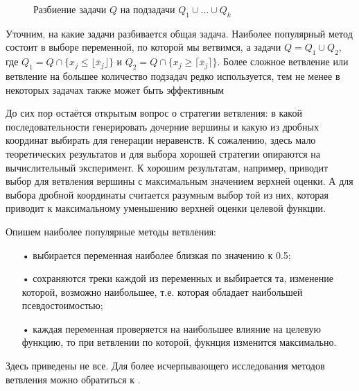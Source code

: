\documentclass[a4paper,14pt,russian]{extreport}
\begin{document}
\par
\begin{figure}[h]
\caption{Разбиение задачи $Q$ на подзадачи $Q_1 \cup \dots \cup Q_k$}
\label{ris:branching}
\end{figure}
\par
Уточним, на какие задачи разбивается общая задача. Наиболее популярный метод состоит в выборе переменной, по которой мы ветвимся, а задачи $Q = Q_1 \cup Q_2$, где $Q_1 = Q \cap \{x_j \le \lfloor \bar x_j \rfloor \}$ и $Q_2 = Q \cap \{x_j \ge \lceil \bar x_j \rceil \}$. Более сложное ветвление или ветвление на большее количество подзадач редко используется, тем не менее в некоторых задачах также может быть эффективным \cite{borndoerfer} \cite{clochard} \cite{naddef}
\par
До сих пор остаётся открытым вопрос о стратегии ветвления: в какой последовательности генерировать дочерние вершины и какую из дробных координат выбирать для генерации неравенств. К сожалению, здесь мало теоретических результатов и для выбора хорошей стратегии опираются на вычислительный эксперимент. К хорошим результатам, например, приводит выбор для ветвления вершины с максимальным значением верхней оценки. А для выбора дробной координаты считается разумным выбор той из них, которая приводит к максимальному уменьшению верхней оценки целевой функции. 
\par
Опишем наиболее популярные методы ветвления:
\begin{itemize}
\item[•] выбирается переменная наиболее близкая по значению к 0.5;
\item[•] сохраняются треки каждой из переменных и выбирается та, изменение которой, возможно наибольшее, т.е. которая обладает наибольшей псевдостоимостью;
\item[•] каждая переменная проверяется на наибольшее влияние на целевую функцию, то при ветвлении по которой, фукнция изменится максимально.
\end{itemize}
\par
Здесь приведены не все. Для более исчерпывающего исследования методов ветвления можно обратиться к \cite{land_powell} \cite{linderoth} \cite{fuegenschuh}.
\end{document}
